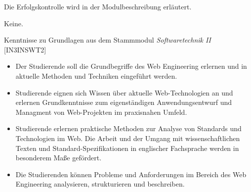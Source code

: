 \begin{course}

\setdoclanguagegerman
{}



\coursehead


\label{cour_5051.dp_997}


\begin{styleenv}
\begin{assessment}
Die Erfolgskontrolle wird in der Modulbeschreibung erläutert.


\end{assessment}

\begin{conditions}Keine.\end{conditions}

\begin{recommendations}Kenntnisse zu Grundlagen aus dem Stammmodul \emph{Softwaretechnik II }[IN3INSWT2]

\end{recommendations}
\end{styleenv}

\begin{learningoutcomes}
\begin{itemize}\item  Der Studierende soll die Grundbegriffe des Web Engineering erlernen und in aktuelle Methoden und Techniken eingeführt werden.  \item Studierende eignen sich Wissen über aktuelle Web-Technologien an und erlernen Grundkenntnisse zum eigenständigen Anwendungsentwurf und Managment von Web-Projekten im praxisnahen Umfeld.   \item Studierende erlernen praktische Methoden zur Analyse von Standards und Technologien im Web. Die Arbeit und der Umgang mit wissenschaftlichen Texten und Standard-Spezifikationen in englischer Fachsprache werden in besonderem Maße gefördert.  \item Die Studierenden können Probleme und Anforderungen im Bereich des Web Engineering analysieren, strukturieren und beschreiben.   \end{itemize}
\end{learningoutcomes}


\end{course}
